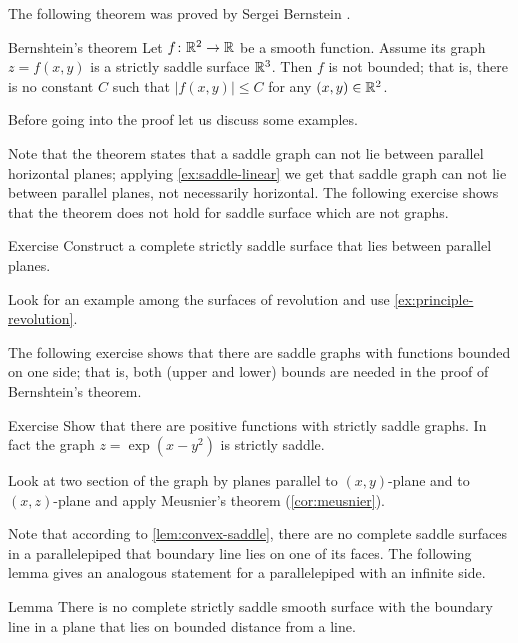 The following theorem was proved by Sergei Bernstein \cite{bernstein}.

\begin{thm}{Bernshtein's theorem}\label{thm:bernshtein}
Let $f\colon\mathbb{R}^2\to\mathbb{R}$ be a smooth function.
Assume its graph $z=f(x,y)$ is a strictly saddle surface $\mathbb{R}^3$.
Then $f$ is not bounded;
that is, there is no constant $C$ such that 
$|f(x,y)|\le C$ for any $(x,y)\in\mathbb{R}^2$.
\end{thm}

Before going into the proof let us discuss some examples.

Note that the theorem states that a saddle graph can not lie between parallel horizontal planes;
applying \ref{ex:saddle-linear} we get that saddle graph can not lie between parallel planes,
not necessarily horizontal.
The following exercise shows that the theorem does not hold for saddle surface which are not graphs.


\begin{thm}{Exercise}\label{ex:between-parallels}
Construct a complete strictly saddle surface that lies between parallel planes.
\end{thm}

 Look for an example among the surfaces of revolution and use \ref{ex:principle-revolution}.


The following exercise shows that there are saddle graphs with functions bounded on one side; that is, both (upper and lower) bounds are needed in the proof of Bernshtein's theorem.

\begin{thm}{Exercise}\label{ex:one-side-bernshtein}
Show that there are positive functions with strictly saddle graphs.
In fact the graph
$z=\exp(x-y^2)$
is strictly saddle.
\end{thm}

 Look at two section of the graph by planes parallel to $(x,y)$-plane and to $(x,z)$-plane and apply Meusnier's theorem (\ref{cor:meusnier}).

Note that according to \ref{lem:convex-saddle}, there are no complete saddle surfaces in a parallelepiped that boundary line lies on one of its faces.
The following lemma gives an analogous statement for a parallelepiped with an infinite side.

\begin{thm}{Lemma}\label{lem:region}
There is no complete strictly saddle smooth surface 
with the boundary line in a plane
that lies on bounded distance from a line.
\end{thm}

